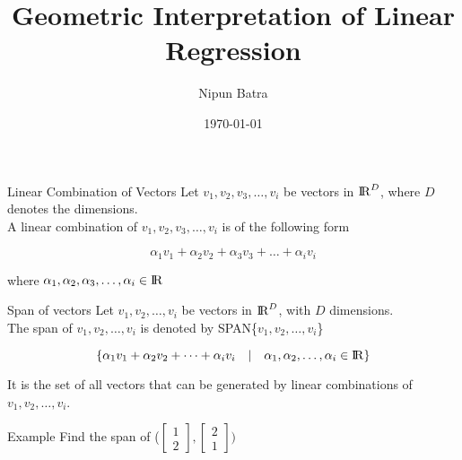 \documentclass{beamer}
\title{Geometric Interpretation of Linear Regression}
\date{\today}
\author{Nipun Batra}
\institute{IIT Gandhinagar}
\begin{document}
	\maketitle
	
	
	\begin{frame}{Linear Combination of Vectors}
		Let $v_{1},v_{2},v_{3},\dots,v_{i}$ be vectors in  ${\rm I\!R}^{D}$, where $D$ denotes the dimensions. \pause \\A linear combination of $v_{1},v_{2},v_{3},\dots,v_{i}$ is of the following form
		
		\pause \begin{equation*}
			\alpha_{1}v_{1}+			\alpha_{2}v_{2}+			\alpha_{3}v_{3}+
			\dots+\alpha_{i}v_{i}
		\end{equation*}
		
		where $\alpha_{1},\alpha_{2},\alpha_{3},\dots,\alpha_{i} \in {\rm I\!R}$
		
	\end{frame}

\begin{frame}{Span of vectors}
		Let $v_{1},v_{2},\dots,v_{i}$ be vectors in  ${\rm I\!R}^{D}$, with $D$ dimensions. \\
		\pause The span of  $v_{1},v_{2},\dots,v_{i}$ is denoted by SPAN\{$v_{1},v_{2},\dots,v_{i} $\}
		
		\pause \begin{equation*}
	    \{	\alpha_{1}v_{1}+			\alpha_{2}v_{2}+
		\dots+\alpha_{i}v_{i} \hspace{1em}\vert \hspace{1em}  \alpha_{1},\alpha_{2},\dots,\alpha_{i} \in {\rm I\!R}\}
		\end{equation*}
		
		\pause  It is the set of all vectors that can be generated by linear combinations of $v_{1},v_{2},\dots,v_{i}$.
\end{frame}

\begin{frame}{Example}
Find the span of ($\begin{bmatrix}
1 \\2
\end{bmatrix}, \begin{bmatrix}
2 \\1
\end{bmatrix}) $

\pause {}



\end{frame}
\end{document}
